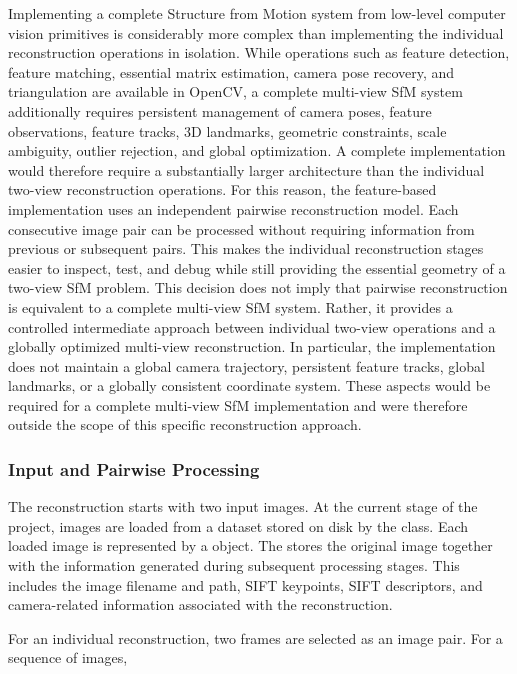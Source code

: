 Implementing a complete Structure from Motion system from low-level computer
vision primitives is considerably more complex than implementing the
individual reconstruction operations in isolation. While operations such as
feature detection, feature matching, essential matrix estimation, camera
pose recovery, and triangulation are available in OpenCV, a complete
multi-view SfM system additionally requires persistent management of camera
poses, feature observations, feature tracks, 3D landmarks, geometric
constraints, scale ambiguity, outlier rejection, and global optimization. A complete implementation would therefore require a substantially larger
architecture than the individual two-view reconstruction operations. For this reason, the feature-based implementation uses an independent
pairwise reconstruction model. Each consecutive image pair can be processed
without requiring information from previous or subsequent pairs. This makes
the individual reconstruction stages easier to inspect, test, and debug while
still providing the essential geometry of a two-view SfM problem. This decision does not imply that pairwise reconstruction is equivalent to a
complete multi-view SfM system. Rather, it provides a controlled intermediate
approach between individual two-view operations and a globally optimized
multi-view reconstruction. In particular, the implementation does not maintain a global camera
trajectory, persistent feature tracks, global landmarks, or a globally
consistent coordinate system. These aspects would be required for a complete
multi-view SfM implementation and were therefore outside the scope of this
specific reconstruction approach.

\subsubsection{Input and Pairwise Processing}

The reconstruction starts with two input images. At the current stage of the
project, images are loaded from a dataset stored on disk by the
 class. Each loaded image is represented by a  object.
The  stores the original image together with the information
generated during subsequent processing stages. This includes the image
filename and path, SIFT keypoints, SIFT descriptors, and camera-related
information associated with the reconstruction.

For an individual reconstruction, two frames are selected as an image pair.
For a sequence of images,

